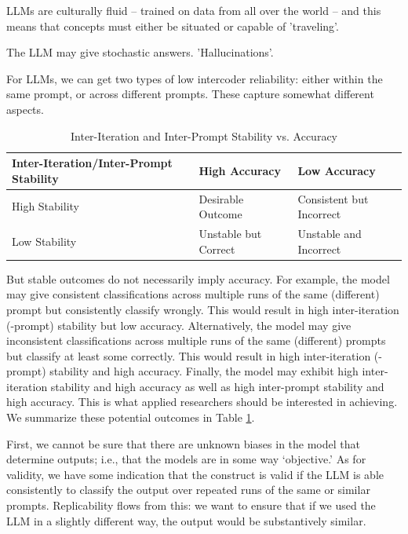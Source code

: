 LLMs are culturally fluid -- trained on data from all over the world -- and this means that concepts must either be situated or capable of 'traveling'.

The LLM may give stochastic answers. 'Hallucinations'.

For LLMs, we can get two types of low intercoder reliability: either within the same prompt, or across different prompts. These capture somewhat different aspects. 

\begin{table}[ht]
\centering
\caption{Inter-Iteration and Inter-Prompt Stability vs. Accuracy}
\renewcommand{\arraystretch}{1.5}
\setlength{\tabcolsep}{4pt}
\label{intertab}
\begin{tabular}{|>{\centering\arraybackslash}m{5cm}|>{\centering\arraybackslash}m{3cm}|>{\centering\arraybackslash}m{3cm}|}
\hline
\rowcolor[HTML]{EFEFEF} 
\textbf{Inter-Iteration/Inter-Prompt Stability} & \textbf{High Accuracy} & \textbf{Low Accuracy} \\ \hline
High Stability & \cellcolor[HTML]{FEACA5}Desirable Outcome & Consistent but Incorrect \\ \hline
Low Stability & Unstable but Correct & Unstable and Incorrect \\ \hline
\end{tabular}
\end{table}

But stable outcomes do not necessarily imply accuracy. For example, the model may give consistent classifications across multiple runs of the same (different) prompt but consistently classify wrongly. This would result in high inter-iteration (-prompt) stability but low accuracy. Alternatively, the model may give inconsistent classifications across multiple runs of the same (different) prompts but classify at least some correctly. This would result in high inter-iteration (-prompt) stability and high accuracy. Finally, the model may exhibit high inter-iteration stability and high accuracy as well as high inter-prompt stability and high accuracy. This is what applied researchers should be interested in achieving. We summarize these potential outcomes in Table \ref{intertab}.

First, we cannot be sure that there are unknown biases in the model that determine outputs; i.e., that the models are in some way `objective.' As for validity, we have some indication that the construct is valid if the LLM is able consistently to classify the output over repeated runs of the same or similar prompts. Replicability flows from this: we want to ensure that if we used the LLM in a slightly different way, the output would be substantively similar.

